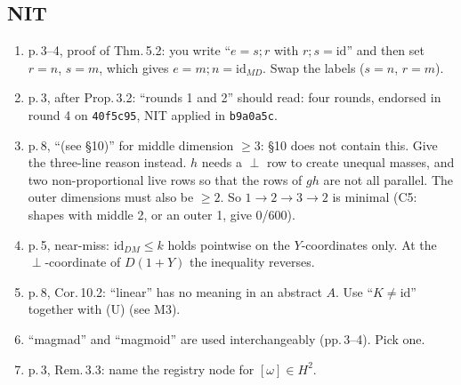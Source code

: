 \documentclass[11pt]{article}
\begin{document}
\subsection*{NIT}
\begin{enumerate}[label=\textbf{N\arabic*.},leftmargin=*]
\item p.\,3--4, proof of Thm.\,5.2: you write ``$e=s;r$ with $r;s=\mathrm{id}$'' and then set $r=n$,
  $s=m$, which gives $e=m;n=\mathrm{id}_{MD}$. Swap the labels ($s=n$, $r=m$).
\item p.\,3, after Prop.\,3.2: ``rounds 1 and 2'' should read: four rounds, endorsed in round 4 on
  \texttt{40f5c95}, NIT applied in \texttt{b9a0a5c}.
\item p.\,8, ``(see \S10)'' for middle dimension ${\ge}3$: \S10 does not contain this. Give the
  three-line reason instead. $h$ needs a $\perp$ row to create unequal masses, and two
  non-proportional live rows so that the rows of $gh$ are not all parallel. The outer dimensions must
  also be ${\ge}2$. So $1\to2\to3\to2$ is minimal (C5: shapes with middle 2, or an outer 1, give 0/600).
\item p.\,5, near-miss: $\mathrm{id}_{DM}\le k$ holds pointwise on the $Y$-coordinates only. At the
  $\perp$-coordinate of $D(1+Y)$ the inequality reverses.
\item p.\,8, Cor.\,10.2: ``linear'' has no meaning in an abstract $A$. Use ``$K\ne\mathrm{id}$''
  together with (U) (see M3).
\item ``magmad'' and ``magmoid'' are used interchangeably (pp.\,3--4). Pick one.
\item p.\,3, Rem.\,3.3: name the registry node for $[\omega]\in H^2$.
\end{enumerate}
\end{document}
